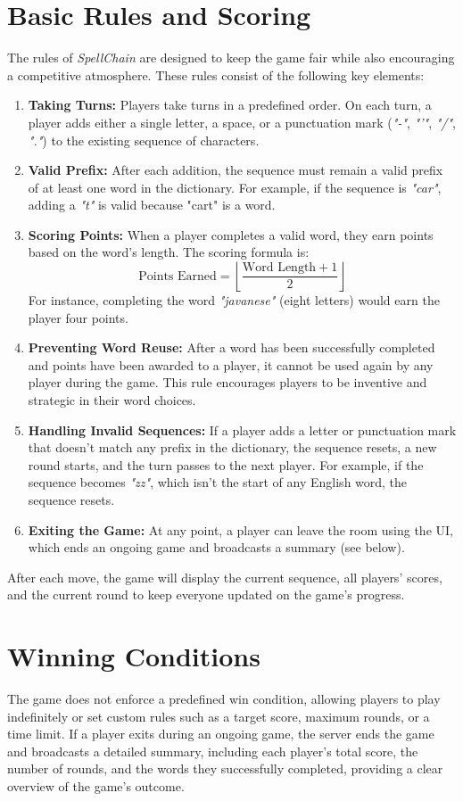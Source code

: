 \documentclass{article}
\begin{document}
\section*{Basic Rules and Scoring}
The rules of \textit{SpellChain} are designed to keep the game fair while also encouraging a competitive atmosphere. These rules consist of the following key elements:
\begin{enumerate}
    \item \textbf{Taking Turns:} Players take turns in a predefined order. On each turn, a player adds either a single letter, a space, or a punctuation mark (\textit{"-"}, \textit{"'"}, \textit{"/"}, \textit{"."}) to the existing sequence of characters.
    \item \textbf{Valid Prefix:} After each addition, the sequence must remain a valid prefix of at least one word in the dictionary. For example, if the sequence is \textit{"car"}, adding a \textit{"t"} is valid because "cart" is a word.
    \item \textbf{Scoring Points:} When a player completes a valid word, they earn points based on the word's length. The scoring formula is:
    \[
        \text{Points Earned} = \left\lfloor \frac{\text{Word Length} + 1}{2} \right\rfloor
    \]
    For instance, completing the word \textit{"javanese"} (eight letters) would earn the player four points.
    \item \textbf{Preventing Word Reuse:} After a word has been successfully completed and points have been awarded to a player, it cannot be used again by any player during the game. This rule encourages players to be inventive and strategic in their word choices.
    \item \textbf{Handling Invalid Sequences:} If a player adds a letter or punctuation mark that doesn't match any prefix in the dictionary, the sequence resets, a new round starts, and the turn passes to the next player. For example, if the sequence becomes \textit{"zz"}, which isn't the start of any English word, the sequence resets.
    \item \textbf{Exiting the Game:} At any point, a player can leave the room using the UI, which ends an ongoing game and broadcasts a summary (see below).
\end{enumerate}
After each move, the game will display the current sequence, all players' scores, and the current round to keep everyone updated on the game's progress.

\section*{Winning Conditions}
The game does not enforce a predefined win condition, allowing players to play indefinitely or set custom rules such as a target score, maximum rounds, or a time limit. If a player exits during an ongoing game, the server ends the game and broadcasts a detailed summary, including each player's total score, the number of rounds, and the words they successfully completed, providing a clear overview of the game's outcome.
\end{document}
